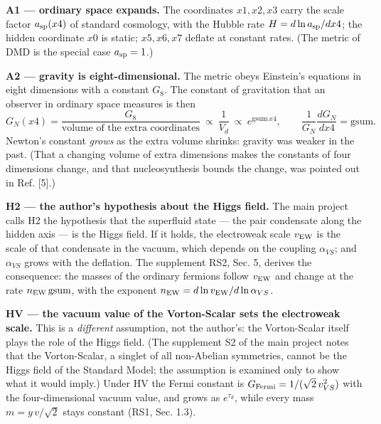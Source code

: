 \documentclass[
  10pt,
]{article}
\begin{document}
\textbf{A1 --- ordinary space expands.} The coordinates \(x1,x2,x3\)
carry the scale factor \(a_{\rm sp}(x4)\) of standard cosmology, with
the Hubble rate \(H=d\ln a_{\rm sp}/dx4\); the hidden coordinate \(x0\)
is static; \(x5,x6,x7\) deflate at constant rates. (The metric of DMD is
the special case \(a_{\rm sp}=1\).)

\textbf{A2 --- gravity is eight-dimensional.} The metric obeys
Einstein's equations in eight dimensions with a constant \(G_8\). The
constant of gravitation that an observer in ordinary space measures is
then
\[G_N(x4)=\frac{G_8}{\text{volume of the extra coordinates}}\ \propto\ \frac1{V_d}\ \propto\ e^{\mathrm{gsum}\,x4},
\qquad\frac{1}{G_N}\frac{dG_N}{dx4}=\mathrm{gsum}.\tag{1.1}\] Newton's
constant \emph{grows} as the extra volume shrinks: gravity was weaker in
the past. (That a changing volume of extra dimensions makes the
constants of four dimensions change, and that nucleosynthesis bounds the
change, was pointed out in Ref. {[}5{]}.)

\textbf{H2 --- the author's hypothesis about the Higgs field.} The main
project calls H2 the hypothesis that the superfluid state --- the pair
condensate along the hidden axis --- is the Higgs field. If it holds,
the electroweak scale \(v_{\rm EW}\) is the scale of that condensate in
the vacuum, which depends on the coupling \(\alpha_{VS}\); and
\(\alpha_{VS}\) grows with the deflation. The supplement RS2, Sec. 5,
derives the consequence: the masses of the ordinary fermions follow
\(v_{\rm EW}\) and change at the rate \(n_{\rm EW}\,\mathrm{gsum}\),
with the exponent \(n_{\rm EW}=d\ln v_{\rm EW}/d\ln\alpha_{VS}\).

\textbf{HV --- the vacuum value of the Vorton-Scalar sets the
electroweak scale.} This is a \emph{different} assumption, not the
author's: the Vorton-Scalar itself plays the role of the Higgs field.
(The supplement S2 of the main project notes that the Vorton-Scalar, a
singlet of all non-Abelian symmetries, cannot be the Higgs field of the
Standard Model; the assumption is examined only to show what it would
imply.) Under HV the Fermi constant is
\(G_{\rm Fermi}=1/(\sqrt2\,v_{VS}^2)\) with the four-dimensional vacuum
value, and grows as \(e^{\tau_d}\), while every mass \(m=y\,v/\sqrt2\)
stays constant (RS1, Sec. 1.3).
\end{document}
